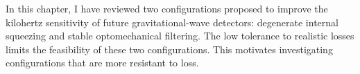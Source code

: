 In this chapter, I have reviewed two configurations proposed to improve the kilohertz sensitivity of future gravitational-wave detectors: degenerate internal squeezing and stable optomechanical filtering.
The low tolerance to realistic losses limits the feasibility of these two configurations. %
This motivates investigating configurations that are more resistant to loss. %


